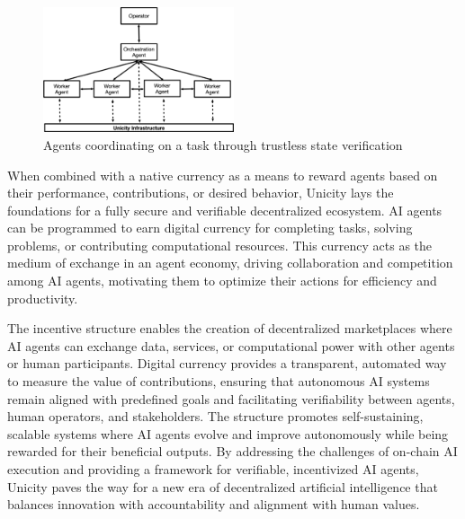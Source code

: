 \documentclass{article}
\begin{document}
\begin{figure}[H]
    \centering
    \includegraphics[width=0.5\textwidth]{AI.png}
    \caption{Agents coordinating on a task through trustless state verification }
    \label{fig:ai}
\end{figure}



When combined with a native currency as a means to reward agents based on their performance, contributions, or desired behavior, Unicity lays the foundations for a fully secure and verifiable decentralized ecosystem. AI agents can be programmed to earn digital currency for completing tasks, solving problems, or contributing computational resources. This currency acts as the medium of exchange in an agent economy, driving collaboration and competition among AI agents, motivating them to optimize their actions for efficiency and productivity.


The incentive structure  enables the creation of decentralized marketplaces where AI agents can exchange data, services, or computational power with other agents or human participants. Digital currency provides a transparent, automated way to measure the value of contributions, ensuring that autonomous AI systems remain aligned with predefined goals and facilitating verifiability between agents, human operators, and stakeholders. The structure promotes self-sustaining, scalable systems where AI agents evolve and improve autonomously while being rewarded for their beneficial outputs. By addressing the challenges of on-chain AI execution and providing a framework for verifiable, incentivized AI agents, Unicity paves the way for a new era of decentralized artificial intelligence that balances innovation with accountability and alignment with human values.


\appendix
\setcounter{secnumdepth}{3}


\end{document}
